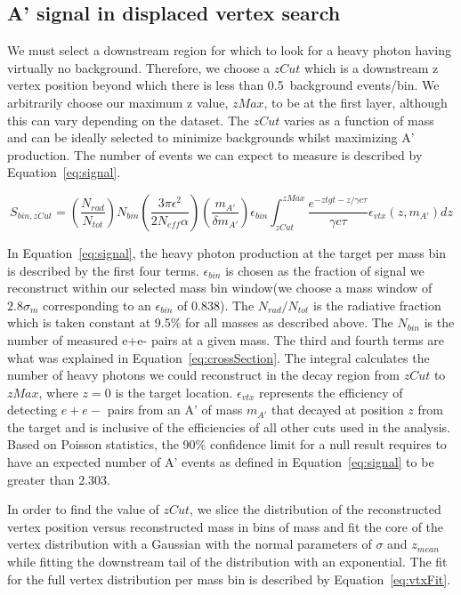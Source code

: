 \documentclass[twoside]{article}
\begin{document}
\subsection{A' signal in displaced vertex search}

We must select a downstream region for which to look for a heavy photon having virtually no background. Therefore, we choose a $zCut$ which is a downstream z vertex position beyond which there is less than 0.5~background events/bin. We arbitrarily choose our maximum z value, $zMax$, to be at the first layer, although this can vary depending on the dataset. The $zCut$ varies as a function of mass and can be ideally selected to minimize backgrounds whilst maximizing A' production. The number of events we can expect to measure is described by Equation~\eqref{eq:signal}.

\begin{equation}
\label{eq:signal}
S_{bin,zCut} = \left( \dfrac{N_{rad}}{N_{tot}}\right) N_{bin}\left(\dfrac{3\pi\epsilon^{2}}{2N_{eff}\alpha}\right)\left(\dfrac{m_{A'}}{\delta m_{A'}}\right)\epsilon_{bin}\int_{zCut}^{zMax}\dfrac{e^{-ztgt-z/\gamma c\tau}}{\gamma c \tau}\epsilon_{vtx}(z,m_{A'})dz
\end{equation}

In Equation~\eqref{eq:signal}, the heavy photon production at the target per mass bin is described by the first four terms. $\epsilon_{bin}$ is chosen as the fraction of signal we reconstruct within our selected mass bin window(we choose a mass window of $2.8\sigma_m$ corresponding to an $\epsilon_{bin}$ of 0.838). The $N_{rad}/N_{tot}$ is the radiative fraction which is taken constant at 9.5$\%$ for all masses as described above. The $N_{bin}$ is the number of measured e+e- pairs at a given mass. The third and fourth terms are what was explained in Equation~\eqref{eq:crossSection}. The integral calculates the number of heavy photons we could reconstruct in the decay region from $zCut$ to $zMax$, where $z=0$ is the target location. $\epsilon_{vtx}$ represents the efficiency of detecting $e+e-$ pairs from an A' of mass $m_{A'}$ that decayed at position $z$ from the target and is inclusive of the efficiencies of all other cuts used in the analysis. Based on Poisson statistics, the 90$\%$ confidence limit for a null result requires to have an expected number of A' events as defined in Equation~\ref{eq:signal} to be greater than 2.303.

In order to find the value of $zCut$, we slice the distribution of the reconstructed vertex position versus reconstructed mass in bins of mass and fit the core of the vertex distribution with a Gaussian with the normal parameters of $\sigma$ and $z_{mean}$ while fitting the downstream tail of the distribution with an exponential. The fit for the full vertex distribution per mass bin is described by Equation~\eqref{eq:vtxFit}.
\end{document}
